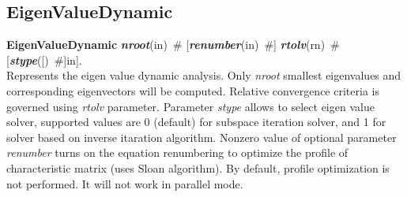 \documentclass[draft]{article}
\newcommand{\param}[1]{{\em #1}}
\newcommand{\keywordnotype}[1]{\mbox{{\it{\bf{#1}}}}}
\newcommand{\keyword}[2]{\mbox{{\keywordnotype{#1}\tiny (#2)}}}
\newcommand{\entKeywordInst}[1]{\mbox{{\bf{{#1}}}}}
\newcommand{\field}[2]{\mbox{\keyword{#1}{#2}~\#}}
\newcommand{\optField}[2]{\mbox{[\field{#1}{#2}]}}
\begin{document}
\subsection{EigenValueDynamic}
\label{EigenValueDynamic}
\entKeywordInst{EigenValueDynamic} \field{nroot}{in} \optField{renumber}{in}
\field{rtolv}{rn} \optField{stype}[in].\\
Represents the eigen value dynamic analysis.
Only \param{nroot} smallest eigenvalues and corresponding
eigenvectors will be computed. Relative convergence criteria is
governed using \param{rtolv} parameter.
Parameter \param{stype} allows to select eigen value solver, supported
values are 0 (default) for subspace iteration solver, and 1 for solver
based on inverse itaration algorithm.
Nonzero value of optional parameter \param{renumber} turns on the
equation renumbering to optimize the profile of characteristic matrix
(uses Sloan algorithm). By default, profile optimization is not
performed. It will not work in parallel mode.
\end{document}
